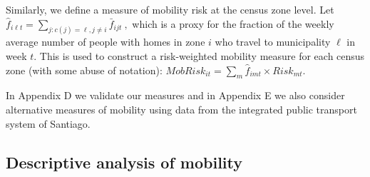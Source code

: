 Similarly, we define a measure of mobility risk at the census zone level. Let
$\hat f_{i\ell t}=\sum_{j:c(j)=\ell, j\neq i}\bar f_{ijt} \ ,$ which is a proxy for the fraction of the weekly average number of people with homes in zone $i$ who travel to municipality  $\ell$ in week $t$. This is used to construct a risk-weighted mobility measure for each census zone (with some abuse of notation):
$
    MobRisk_{it}=\sum_{m}\hat f_{imt}\times Risk_{mt}.  
$

In Appendix D we validate our measures and in Appendix E we also consider alternative measures of mobility using data from the integrated public transport system of Santiago.

\subsection{Descriptive analysis of mobility}

